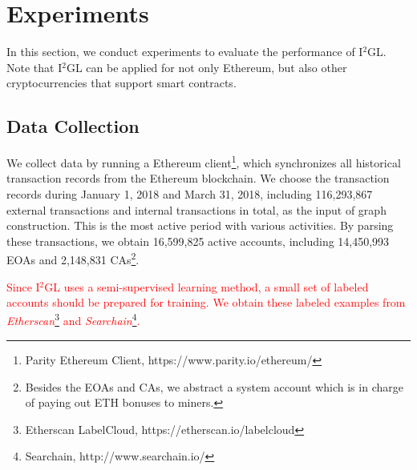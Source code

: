 
\section{Experiments}
\label{sec:experiments}
In this section, we conduct experiments to evaluate the performance of I$^2$GL. Note that I$^2$GL can be applied for not only Ethereum, but also other cryptocurrencies that support smart contracts.

\subsection{Data Collection}
We collect data by running a  Ethereum client\footnote{Parity Ethereum Client, https://www.parity.io/ethereum/}, which synchronizes all historical transaction records from the Ethereum blockchain. We choose the transaction records during January 1, 2018 and March 31, 2018, including 116,293,867 external transactions and internal transactions in total, as the input of graph construction. This is the most active period with various activities. By parsing these transactions, we obtain 16,599,825 active accounts, including 14,450,993 EOAs and 2,148,831 CAs\footnote{Besides the EOAs and CAs, we abstract a system account which is in charge of paying out ETH bonuses to miners.}.

\textcolor{red}{Since I$^2$GL uses a semi-supervised learning method, a small set of labeled accounts should be prepared for training. We obtain these labeled examples from \emph{Etherscan}\footnote{Etherscan LabelCloud, https://etherscan.io/labelcloud} and \emph{Searchain}\footnote{Searchain, http://www.searchain.io/}.}



